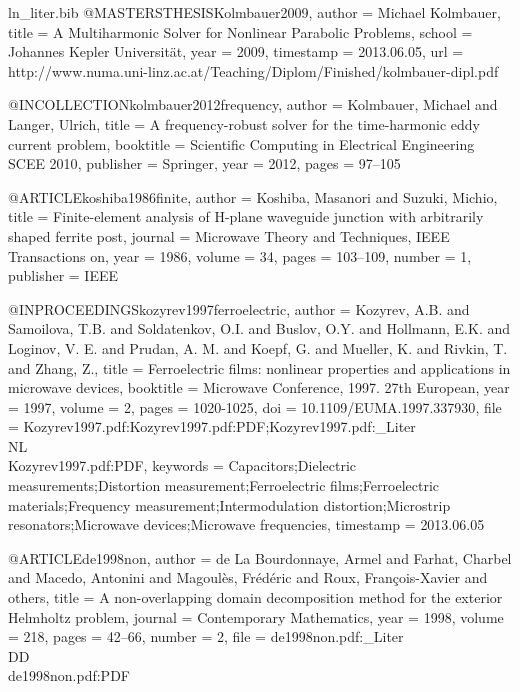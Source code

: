 \begin{filecontents*}{ln_liter.bib}
@MASTERSTHESIS{Kolmbauer2009,
  author = {Michael Kolmbauer},
  title = {A Multiharmonic Solver for Nonlinear Parabolic Problems},
  school = {Johannes Kepler Universit\"at},
  year = {2009},
  timestamp = {2013.06.05},
  url = {http://www.numa.uni-linz.ac.at/Teaching/Diplom/Finished/kolmbauer-dipl.pdf}
}

@INCOLLECTION{kolmbauer2012frequency,
  author = {Kolmbauer, Michael and Langer, Ulrich},
  title = {A frequency-robust solver for the time-harmonic eddy current problem},
  booktitle = {Scientific Computing in Electrical Engineering SCEE 2010},
  publisher = {Springer},
  year = {2012},
  pages = {97--105}
}

@ARTICLE{koshiba1986finite,
  author = {Koshiba, Masanori and Suzuki, Michio},
  title = {Finite-element analysis of {H}-plane waveguide junction with arbitrarily
	shaped ferrite post},
  journal = {Microwave Theory and Techniques, IEEE Transactions on},
  year = {1986},
  volume = {34},
  pages = {103--109},
  number = {1},
  publisher = {IEEE}
}

@INPROCEEDINGS{kozyrev1997ferroelectric,
  author = {Kozyrev, A.B. and Samoilova, T.B. and Soldatenkov, O.I. and Buslov,
	O.Y. and Hollmann, E.K. and Loginov, V. E. and Prudan, A. M. and
	Koepf, G. and Mueller, K. and Rivkin, T. and Zhang, Z.},
  title = {Ferroelectric films: nonlinear properties and applications in microwave
	devices},
  booktitle = {Microwave Conference, 1997. 27th European},
  year = {1997},
  volume = {2},
  pages = {1020-1025},
  doi = {10.1109/EUMA.1997.337930},
  file = {Kozyrev1997.pdf:Kozyrev1997.pdf:PDF;Kozyrev1997.pdf:_Liter\\NL\\Kozyrev1997.pdf:PDF},
  keywords = {Capacitors;Dielectric measurements;Distortion measurement;Ferroelectric
	films;Ferroelectric materials;Frequency measurement;Intermodulation
	distortion;Microstrip resonators;Microwave devices;Microwave frequencies},
  timestamp = {2013.06.05}
}

@ARTICLE{de1998non,
  author = {de La Bourdonnaye, Armel and Farhat, Charbel and Macedo, Antonini
	and Magoul{\`e}s, Fr{\'e}d{\'e}ric and Roux, Fran{\c{c}}ois-Xavier
	and others},
  title = {A non-overlapping domain decomposition method for the exterior {Helmholtz}
	problem},
  journal = {Contemporary Mathematics},
  year = {1998},
  volume = {218},
  pages = {42--66},
  number = {2},
  file = {de1998non.pdf:_Liter\\DD\\de1998non.pdf:PDF}
}


\end{filecontents*}
